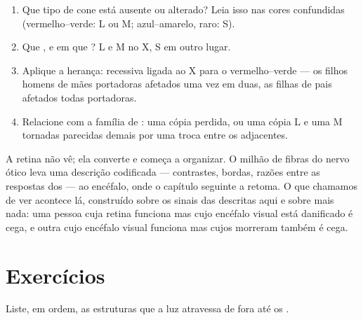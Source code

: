 \begin{method}\label{met:g11:the-eye:case}
\begin{enumerate}
  \item Que tipo de cone está ausente ou alterado? Leia isso nas cores
        confundidas (vermelho--verde: L ou M; azul--amarelo, raro: S).
  \item Que , e em que ? L e M no X, S em outro lugar.
  \item Aplique a herança: recessiva ligada ao X para o
        vermelho--verde --- os filhos homens de mães portadoras
        afetados uma vez em duas, as filhas de pais afetados todas
        portadoras.
  \item Relacione com a família de : uma cópia perdida, ou uma
        cópia L e uma M tornadas parecidas demais por uma troca entre
        os  adjacentes.
\end{enumerate}
\end{method}

\begin{remark}\label{rem:g11:the-eye:tobrain}
A retina não vê; ela converte e começa a organizar. O milhão de fibras
do nervo ótico leva uma descrição codificada --- contrastes, bordas,
razões entre as respostas dos  --- ao encéfalo, onde o capítulo
seguinte a retoma. O que chamamos de ver acontece lá, construído sobre
os sinais das  descritas aqui e sobre mais nada: uma pessoa cuja
retina funciona mas cujo encéfalo visual está danificado é cega, e
outra cujo encéfalo visual funciona mas cujos  morreram
também é cega.
\end{remark}

\section{Exercícios}

\begin{exercise}[$\star$]\label{exo:g11:the-eye:1}
Liste, em ordem, as estruturas que a luz atravessa de fora até os
.
\end{exercise}

